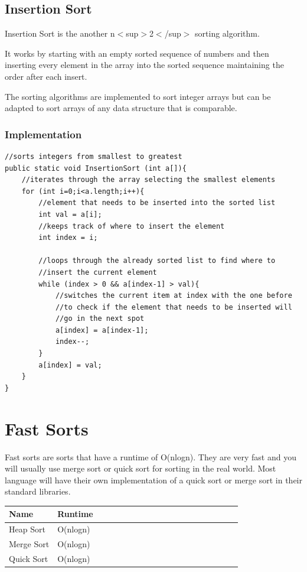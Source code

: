 \documentclass[11pt,oneside]{book}
\begin{document}
        \section{ Insertion Sort }
        

Insertion Sort is the another n$<$sup$>$2$<$/sup$>$ sorting algorithm.

It works by starting with an empty sorted sequence of numbers and then inserting every element in the array into the sorted sequence maintaining the order after each insert.

The sorting algorithms are implemented to sort integer arrays but can be adapted to sort arrays of any data structure that is comparable.

\subsection{Implementation}

\begin{lstlisting}
//sorts integers from smallest to greatest
public static void InsertionSort (int a[]){
    //iterates through the array selecting the smallest elements
    for (int i=0;i<a.length;i++){
        //element that needs to be inserted into the sorted list
        int val = a[i]; 
        //keeps track of where to insert the element
        int index = i; 
        
        //loops through the already sorted list to find where to 
        //insert the current element
        while (index > 0 && a[index-1] > val){
            //switches the current item at index with the one before 
            //to check if the element that needs to be inserted will 
            //go in the next spot
            a[index] = a[index-1];
            index--;
        }
        a[index] = val;
    }
}
\end{lstlisting}

    \chapter{ Fast Sorts }
        

Fast sorts are sorts that have a runtime of O(nlogn). They are very fast and you will usually use merge sort or quick sort for sorting in the real world. Most language will have their own implementation of a quick sort or merge sort in their standard libraries. 
\vspace{10px}\begin{tabulary}{0.4\linewidth}{|l|l|l|l|l|l|l|l|l|l|l|l|l|l|l|l|l|l|l}\hline


  Name &
  Runtime\\
\hline


  Heap Sort &
  O(nlogn)\\

  Merge Sort &
  O(nlogn)\\

  Quick Sort &
  O(nlogn)\\

\hline\end{tabulary}
\end{document}
